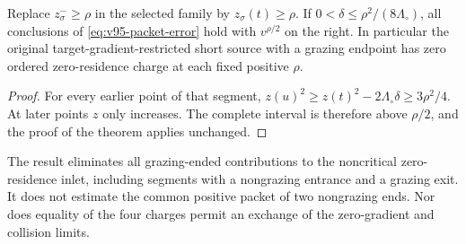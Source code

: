 \begin{corollary}
\label{cor:v95-target-gradient}
Replace $z_\sigma^-\ge\rho$ in the selected family by
$z_\sigma(t)\ge\rho$. If $0<\delta\le\rho^2/(8\Lambda_\circ)$,
all conclusions of \eqref{eq:v95-packet-error} hold with $v^{\rho/2}$
on the right. In particular the original target-gradient-restricted
short source with a grazing endpoint has zero ordered zero-residence
charge at each fixed positive $\rho$.
\end{corollary}
\begin{proof}
For every earlier point of that segment,
$z(u)^2\ge z(t)^2-2\Lambda_\circ\delta\ge3\rho^2/4$.
At later points $z$ only increases. The complete interval is therefore
above $\rho/2$, and the proof of the theorem applies unchanged.
\end{proof}

The result eliminates all grazing-ended contributions to the
noncritical zero-residence inlet, including segments with a nongrazing
entrance and a grazing exit. It does not estimate the common positive
packet of two nongrazing ends. Nor does equality of the four charges
permit an exchange of the zero-gradient and collision limits.

